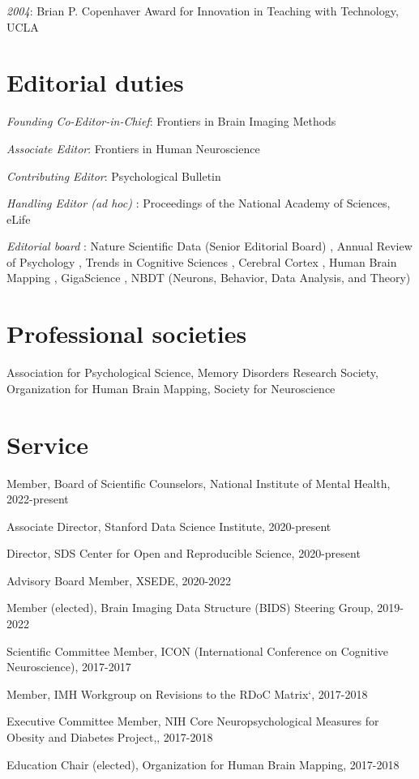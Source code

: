 \documentclass[10pt, letterpaper]{article}
\begin{document}
\textit{2004}: Brian P. Copenhaver Award for Innovation in Teaching with Technology, UCLA


\section*{Editorial duties}
\noindent
\textit{Founding Co-Editor-in-Chief}: Frontiers in Brain Imaging Methods

\textit{Associate Editor}: Frontiers in Human Neuroscience

\textit{Contributing Editor}: Psychological Bulletin

\textit{Handling Editor (ad hoc) }: Proceedings of the National Academy of Sciences, eLife 

\textit{Editorial board }: Nature Scientific Data (Senior Editorial Board) , Annual Review of Psychology , Trends in Cognitive Sciences , Cerebral Cortex , Human Brain Mapping , GigaScience , NBDT (Neurons, Behavior, Data Analysis, and Theory) 


\section*{Professional societies}
\noindent
Association for Psychological Science, Memory Disorders Research Society, Organization for Human Brain Mapping, Society for Neuroscience


\section*{Service}
\noindent
Member, Board of Scientific Counselors, National Institute of Mental Health, 2022-present

Associate Director, Stanford Data Science Institute, 2020-present

Director, SDS Center for Open and Reproducible Science, 2020-present

Advisory Board Member, XSEDE, 2020-2022

Member (elected), Brain Imaging Data Structure (BIDS) Steering Group, 2019-2022

Scientific Committee Member, ICON (International Conference on Cognitive Neuroscience), 2017-2017

Member, IMH Workgroup on Revisions to the RDoC Matrix`, 2017-2018

Executive Committee Member, NIH Core Neuropsychological Measures for Obesity and Diabetes Project,, 2017-2018

Education Chair (elected), Organization for Human Brain Mapping, 2017-2018
\end{document}
